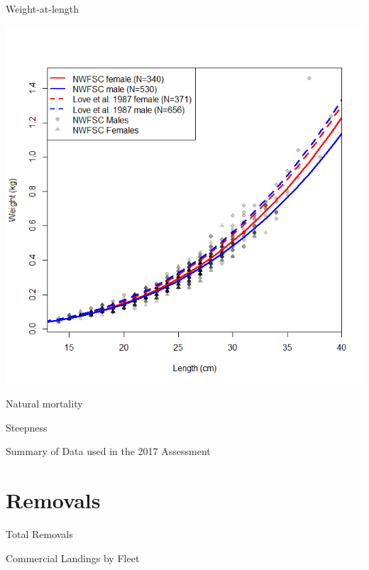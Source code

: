 \documentclass[ignorenonframetext,]{beamer}
\begin{document}
\begin{frame}{Weight-at-length}

\includegraphics{Figures/Length_weight.png}

\end{frame}

\begin{frame}{Natural mortality}

\end{frame}

\begin{frame}{Steepness}

\end{frame}

\begin{frame}{Summary of Data used in the 2017 Assessment}

\end{frame}

\section{Removals}\label{removals}

\begin{frame}{Total Removals}

\end{frame}

\begin{frame}{Commercial Landings by Fleet}

\end{frame}
\end{document}
